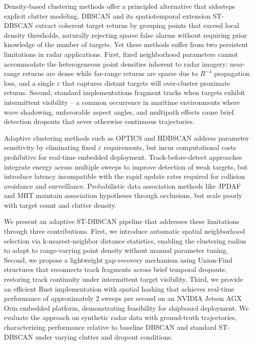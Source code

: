 \documentclass[conf]{new-aiaa}
\begin{document}
Density-based clustering methods offer a principled alternative that sidesteps explicit clutter modeling. DBSCAN \cite{Ester1996} and its spatiotemporal extension ST-DBSCAN \cite{Birant2007} extract coherent target returns by grouping points that exceed local density thresholds, naturally rejecting sparse false alarms without requiring prior knowledge of the number of targets. Yet these methods suffer from two persistent limitations in radar applications. First, fixed neighborhood parameters cannot accommodate the heterogeneous point densities inherent to radar imagery: near-range returns are dense while far-range returns are sparse due to $R^{-4}$ propagation loss, and a single $\varepsilon$ that captures distant targets will over-cluster proximate returns. Second, standard implementations fragment tracks when targets exhibit intermittent visibility -- a common occurrence in maritime environments where wave shadowing, unfavorable aspect angles, and multipath effects cause brief detection dropouts that sever otherwise continuous trajectories.

Adaptive clustering methods such as OPTICS \cite{Ankerst1999} and HDBSCAN \cite{Campello2013} address parameter sensitivity by eliminating fixed $\varepsilon$ requirements, but incur computational costs prohibitive for real-time embedded deployment. Track-before-detect approaches \cite{Davey2008} integrate energy across multiple sweeps to improve detection of weak targets, but introduce latency incompatible with the rapid update rates required for collision avoidance and surveillance. Probabilistic data association methods like JPDAF \cite{Fortmann1983} and MHT \cite{Reid1979} maintain association hypotheses through occlusions, but scale poorly with target count and clutter density.

We present an adaptive ST-DBSCAN pipeline that addresses these limitations through three contributions. First, we introduce automatic spatial neighborhood selection via k-nearest-neighbor distance statistics, enabling the clustering radius to adapt to range-varying point density without manual parameter tuning. Second, we propose a lightweight gap-recovery mechanism using Union-Find structures that reconnects track fragments across brief temporal dropouts, restoring track continuity under intermittent target visibility. Third, we provide an efficient Rust implementation with spatial hashing that achieves real-time performance of approximately 2 sweeps per second on an NVIDIA Jetson AGX Orin embedded platform, demonstrating feasibility for shipboard deployment. We evaluate the approach on synthetic radar data with ground-truth trajectories, characterizing performance relative to baseline DBSCAN and standard ST-DBSCAN under varying clutter and dropout conditions.
\end{document}
